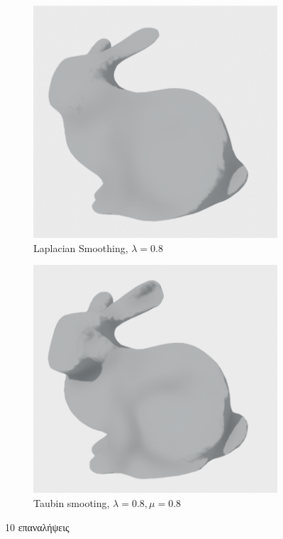 \documentclass{article}
\begin{document}
\begin{figure}[h]
	\begin{subfigure}{0.5\textwidth}
		\includegraphics[width=0.9\linewidth]{"4.png"}
		\caption{Laplacian Smoothing, $\lambda = 0.8$}
	\end{subfigure}
	\begin{subfigure}{0.5\textwidth}
		\includegraphics[width=0.9\linewidth]{"5.png"}
		\caption{Taubin smooting, $\lambda = 0.8, \mu = 0.8$}
	\end{subfigure}
	\caption{10 επαναλήψεις}
\end{figure}
\end{document}
